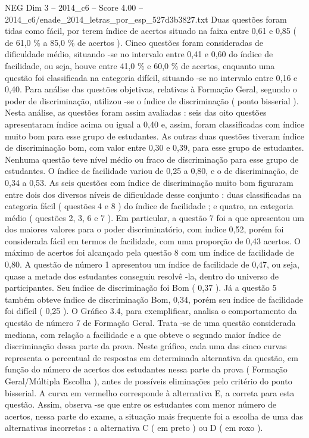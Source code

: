 \begin{textsample}{NEG Dim 3 – 2014\_c6 – Score 4.00 – 2014\_c6/enade\_2014\_letras\_por\_esp\_527d3b3827.txt}
Duas questões foram tidas como fácil, por terem índice de acertos situado na faixa entre 0,61 e 0,85 ( de 61,0 \% a 85,0 \% de acertos ).
Cinco questões foram consideradas de dificuldade médio, situando -se no intervalo entre 0,41 e 0,60 do índice de facilidade, ou seja, houve entre 41,0 \% e 60,0 \% de acertos, enquanto uma questão foi classificada na categoria difícil, situando -se no intervalo entre 0,16 e 0,40.
Para análise das questões objetivas, relativas à Formação Geral, segundo o poder de discriminação, utilizou -se o índice de discriminação ( ponto bisserial ).
Nesta análise, as questões foram assim avaliadas : seis das oito questões apresentaram índice acima ou igual a 0,40 e, assim, foram classificadas com índice muito bom para esse grupo de estudantes.
As outras duas questões tiveram índice de discriminação bom, com valor entre 0,30 e 0,39, para esse grupo de estudantes.
Nenhuma questão teve nível médio ou fraco de discriminação para esse grupo de estudantes.
O índice de facilidade variou de 0,25 a 0,80, e o de discriminação, de 0,34 a 0,53.
As seis questões com índice de discriminação muito bom figuraram entre dois dos diversos níveis de dificuldade desse conjunto : duas classificadas na categoria fácil ( questões 4 e 8 ) do índice de facilidade ; e quatro, na categoria médio ( questões 2, 3, 6 e 7 ).
Em particular, a questão 7 foi a que apresentou um dos maiores valores para o poder discriminatório, com índice 0,52, porém foi considerada fácil em termos de facilidade, com uma proporção de 0,43 acertos.
O máximo de acertos foi alcançado pela questão 8 com um índice de facilidade de 0,80.
A questão de número 1 apresentou um índice de facilidade de 0,47, ou seja, quase a metade dos estudantes conseguiu resolvê -la, dentro do universo de participantes.
Seu índice de discriminação foi Bom ( 0,37 ).
Já a questão 5 também obteve índice de discriminação Bom, 0,34, porém seu índice de facilidade foi difícil ( 0,25 ).
O Gráfico 3.4, para exemplificar, analisa o comportamento da questão de número 7 de Formação Geral.
Trata -se de uma questão considerada mediana, com relação a facilidade e a que obteve o segundo maior índice de discriminação dessa parte da prova.
Neste gráfico, cada uma das cinco curvas representa o percentual de respostas em determinada alternativa da questão, em função do número de acertos dos estudantes nessa parte da prova ( Formação Geral/Múltipla Escolha ), antes de possíveis eliminações pelo critério do ponto bisserial.
A curva em vermelho corresponde à alternativa E, a correta para esta questão.
Assim, observa -se que entre os estudantes com menor número de acertos, nessa parte do exame, a situação mais frequente foi a escolha de uma das alternativas incorretas : a alternativa C ( em preto ) ou D ( em roxo ).

\end{textsample}
